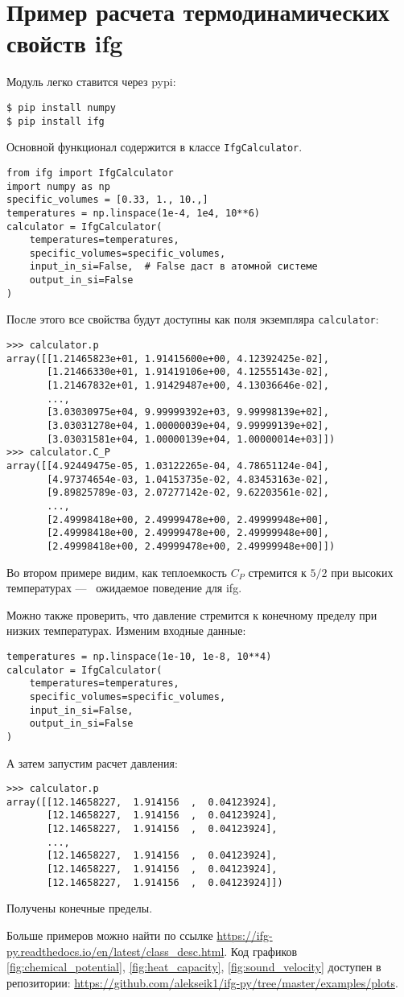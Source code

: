 
\chapter{Пример расчета термодинамических свойств \texorpdfstring{\acrshort{ifg}}{ИФГ}}
Модуль легко ставится через \Gls{pypi}:
\begin{verbatim}
$ pip install numpy
$ pip install ifg
\end{verbatim}

Основной функционал содержится в классе \texttt{IfgCalculator}.
\begin{verbatim}
from ifg import IfgCalculator
import numpy as np
specific_volumes = [0.33, 1., 10.,]
temperatures = np.linspace(1e-4, 1e4, 10**6)
calculator = IfgCalculator(
    temperatures=temperatures,
    specific_volumes=specific_volumes,
    input_in_si=False,  # False даст в атомной системе
    output_in_si=False
)
\end{verbatim}
После этого все свойства будут доступны как поля экземпляра \texttt{calculator}:
\begin{verbatim}
>>> calculator.p
array([[1.21465823e+01, 1.91415600e+00, 4.12392425e-02],
       [1.21466330e+01, 1.91419106e+00, 4.12555143e-02],
       [1.21467832e+01, 1.91429487e+00, 4.13036646e-02],
       ...,
       [3.03030975e+04, 9.99999392e+03, 9.99998139e+02],
       [3.03031278e+04, 1.00000039e+04, 9.99999139e+02],
       [3.03031581e+04, 1.00000139e+04, 1.00000014e+03]])
>>> calculator.C_P
array([[4.92449475e-05, 1.03122265e-04, 4.78651124e-04],
       [4.97374654e-03, 1.04153735e-02, 4.83453163e-02],
       [9.89825789e-03, 2.07277142e-02, 9.62203561e-02],
       ...,
       [2.49998418e+00, 2.49999478e+00, 2.49999948e+00],
       [2.49998418e+00, 2.49999478e+00, 2.49999948e+00],
       [2.49998418e+00, 2.49999478e+00, 2.49999948e+00]])
\end{verbatim}
Во втором примере видим, как теплоемкость $C_P$ стремится к $5/2$ при высоких температурах ---~ ожидаемое поведение для \acrshort{ifg}.

Можно также проверить, что давление стремится к конечному пределу при низких температурах.
Изменим входные данные:
\begin{verbatim}
temperatures = np.linspace(1e-10, 1e-8, 10**4)
calculator = IfgCalculator(
    temperatures=temperatures,
    specific_volumes=specific_volumes,
    input_in_si=False,
    output_in_si=False
)
\end{verbatim}
А затем запустим расчет давления:
\begin{verbatim}
>>> calculator.p
array([[12.14658227,  1.914156  ,  0.04123924],
       [12.14658227,  1.914156  ,  0.04123924],
       [12.14658227,  1.914156  ,  0.04123924],
       ...,
       [12.14658227,  1.914156  ,  0.04123924],
       [12.14658227,  1.914156  ,  0.04123924],
       [12.14658227,  1.914156  ,  0.04123924]])
\end{verbatim}
Получены конечные пределы.

Больше примеров можно найти по ссылке \url{https://ifg-py.readthedocs.io/en/latest/class_desc.html}.
Код графиков \ref{fig:chemical_potential}, \ref{fig:heat_capacity}, \ref{fig:sound_velocity} доступен в репозитории: \url{https://github.com/alekseik1/ifg-py/tree/master/examples/plots}.
